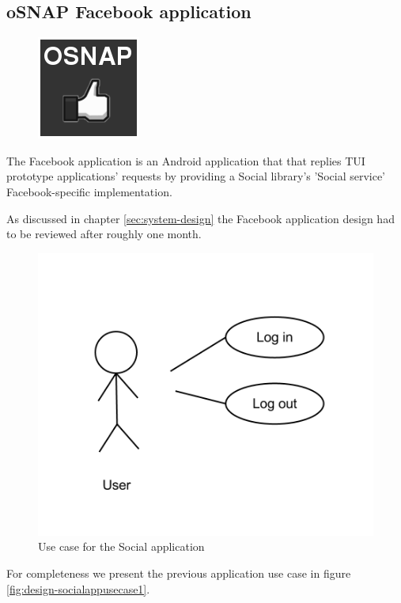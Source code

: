 \subsection{oSNAP Facebook application} \label{section:service-fb}
\begin{figure}
	\centering \includegraphics[scale=0.25]{img/app-fb}
\end{figure}
The Facebook application is an Android application that that replies
TUI prototype applications' requests by providing a Social library's 'Social service'
Facebook-specific implementation.

As discussed in chapter \ref{sec:system-design} the Facebook application design had to be reviewed after roughly one month.

\begin{figure}[H]
	\centering \includegraphics[scale=0.35]{img/design-socialappusecase2}
	\caption{Use case for the Social application}
	\label{fig:design-socialappusecase2}
\end{figure}

For completeness we present the previous application use case in figure \ref{fig:design-socialappusecase1}.

